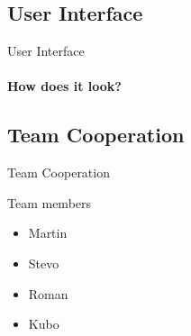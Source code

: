 \documentclass{beamer}
\begin{document}
\begin{darkframes}
    \subsection{User Interface}
    \begin{frame}{User Interface}
      \framesubtitle{How does it look?}%
    \end{frame}
	
	\subsection{Team Cooperation}
	\begin{frame}{Team Cooperation}
	
	Team members
        \begin{itemize}
          \item Martin
          \item Stevo
          \item Roman
          \item Kubo
        \end{itemize}
    

\end{frame}
\end{darkframes}
\end{document}
